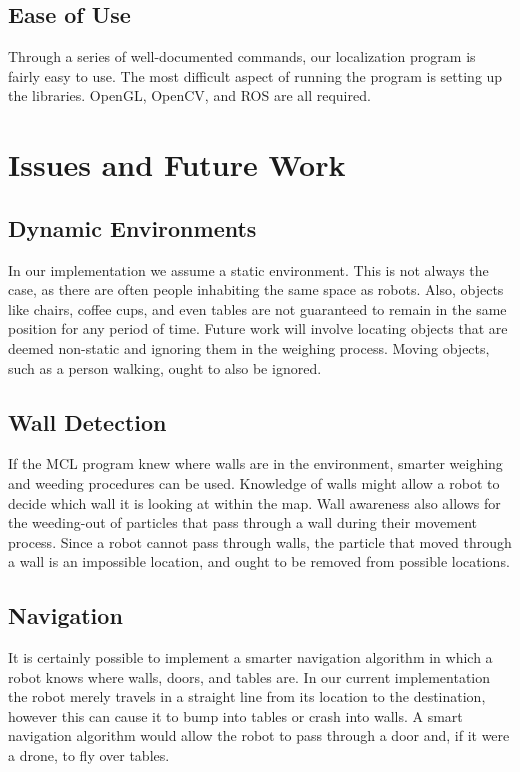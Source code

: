 \documentclass[a4paper,11pt]{article}
\begin{document}
\subsection{Ease of Use}
Through a series of well-documented commands, our localization program is fairly easy to use. The most difficult aspect of running the program is setting up the libraries. OpenGL, OpenCV, and ROS are all required.

\section{Issues and Future Work}
\subsection{Dynamic Environments}
In our implementation we assume a static environment. This is not always the case, as there are often people inhabiting the same space as robots. Also, objects like chairs, coffee cups, and even tables are not guaranteed to remain in the same position for any period of time. Future work will involve locating objects that are deemed non-static and ignoring them in the weighing process. Moving objects, such as a person walking, ought to also be ignored.

\subsection{Wall Detection}
If the MCL program knew where walls are in the environment, smarter weighing and weeding procedures can be used. Knowledge of walls might allow a robot to decide which wall it is looking at within the map. Wall awareness also allows for the weeding-out of particles that pass through a wall during their movement process. Since a robot cannot pass through walls, the particle that moved through a wall is an impossible location, and ought to be removed from possible locations.

\subsection{Navigation}
It is certainly possible to implement a smarter navigation algorithm in which a robot knows where walls, doors, and tables are. In our current implementation the robot merely travels in a straight line from its location to the destination, however this can cause it to bump into tables or crash into walls. A smart navigation algorithm would allow the robot to pass through a door and, if it were a drone, to fly over tables.
\end{document}

